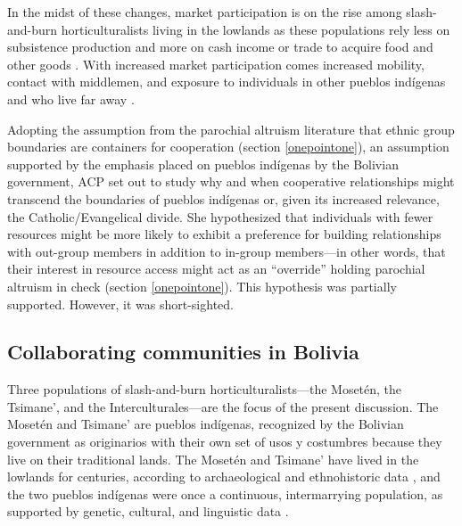 \documentclass[bibauthoryear]{aa}
\begin{document}
In the midst of these changes, market participation is on the rise among slash-and-burn horticulturalists living in the lowlands as these populations rely less on subsistence production and more on cash income or trade to acquire food and other goods \citep{gurven2015does, reyes2010integration}. With increased market participation comes increased mobility, contact with middlemen, and exposure to individuals in other pueblos ind\'igenas and who live far away \citep{pisorjones2020}.

 Adopting the assumption from the parochial altruism literature that ethnic group boundaries are containers for cooperation (section \ref{onepointone}), an assumption supported by the emphasis placed on pueblos ind\'igenas by the Bolivian government, ACP set out to study why and when cooperative relationships might transcend the boundaries of pueblos ind\'igenas or, given its increased relevance, the Catholic/Evangelical divide. She hypothesized that individuals with fewer resources might be more likely to exhibit a preference for building relationships with out-group members in addition to in-group members---in other words, that their interest in resource access might act as an ``override'' holding parochial altruism in check \citep{pisor2016risk, pisor2018diversify} (section \ref{onepointone}). This hypothesis was partially supported. However, it was short-sighted.

\subsection{Collaborating communities in Bolivia}\label{pops2}
Three populations of slash-and-burn horticulturalists---the Moset\'en, the Tsimane’, and the Interculturales---are the focus of the present discussion. The Moset\'en and Tsimane’ are pueblos ind\'igenas, recognized by the Bolivian government as originarios with their own set of usos y costumbres because they live on their traditional lands. The Moset\'en and Tsimane’ have lived in the lowlands for centuries, according to archaeological and ethnohistoric data \citep{godoy2015natural, tomas2008tsimane}, and the two pueblos ind\'igenas were once a continuous, intermarrying population, as supported by genetic, cultural, and linguistic data \citep{bert2001major, godoy2015natural, gurven2007mortality, sakel2011moseten, ringhofer2010exploring}. 
\end{document}
